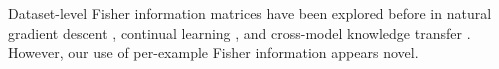\documentclass[dvipsnames]{article}
\begin{document}
Dataset-level Fisher information matrices have been explored before in natural gradient descent \citep{martens2020new}, continual learning \citep{kirkpatrick2017overcoming}, and cross-model knowledge transfer \citep{matena2021merging}.
However, our use of per-example Fisher information appears novel.


















\end{document}

